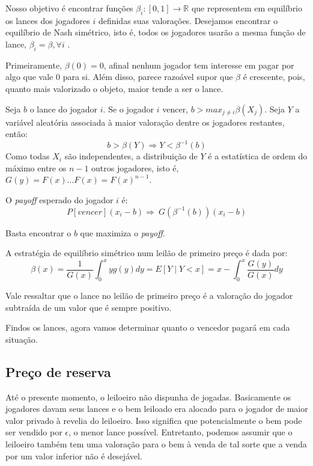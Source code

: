 Nosso objetivo é encontrar funções $\beta_i : [0, 1] \xrightarrow{} \mathbb{R}$ que representem em equilíbrio os lances dos jogadores $i$ definidas suas valorações. Desejamos encontrar o equilíbrio de Nash simétrico, isto é, todos os jogadores usarão a mesma função de lance, $\beta_i = \beta, \forall i$ \citet{krishna}.

Primeiramente, $\beta(0) = 0$, afinal nenhum jogador tem interesse em pagar por algo que vale 0 para si. Além disso, parece razoável supor que $\beta$ é crescente, pois, quanto mais valorizado o objeto, maior tende a ser o lance.

Seja $b$ o lance do jogador $i$. Se o jogador $i$ vencer, $b > max_{j \ne i} \beta(X_j)$. Seja $Y$ a variável aleatória associada à maior valoração dentre os jogadores restantes, então:
\begin{equation}
b > \beta(Y) \Rightarrow Y < \beta^{-1}(b)    
\end{equation}
Como todas $X_i$ são independentes, a distribuição de $Y$ é a estatística de ordem do máximo entre os $n-1$ outros jogadores, isto é, $G(y) = F(x) \ldots F(x) = F(x)^{n-1}$.

O \emph{payoff} esperado do jogador $i$ é:
\begin{equation}
    P[vencer] (x_i - b) \Rightarrow \
    G(\beta^{-1}(b)) (x_i - b)
\end{equation}

Basta encontrar o $b$ que maximiza o \emph{payoff}.

\begin{proposicao}
    \label{prop:nash-primeiro-preco}
    A estratégia de equilíbrio simétrico num leilão de primeiro preço é dada por:
    \begin{equation}
        \beta(x) = \frac{1}{G(x)} \int_{0}^{x} yg(y)dy = E\left[ Y \mid Y<x \right] = x - \int_{0}^{x} \frac{G(y)}{G(x)}dy
    \end{equation}
\end{proposicao}

Vale ressaltar que o lance no leilão de primeiro preço é a valoração do jogador subtraída de um valor que é sempre positivo.

Findos os lances, agora vamos determinar quanto o vencedor pagará em cada situação.

\subsection{Preço de reserva}

Até o presente momento, o leiloeiro não dispunha de jogadas. Basicamente os jogadores davam seus lances e o bem leiloado era alocado para o jogador de maior valor privado à revelia do leiloeiro. Isso significa que potencialmente o bem pode ser vendido por $\epsilon$, o menor lance possível. Entretanto, podemos assumir que o leiloeiro também tem uma valoração para o bem à venda de tal sorte que a venda por um valor inferior não é desejável.

